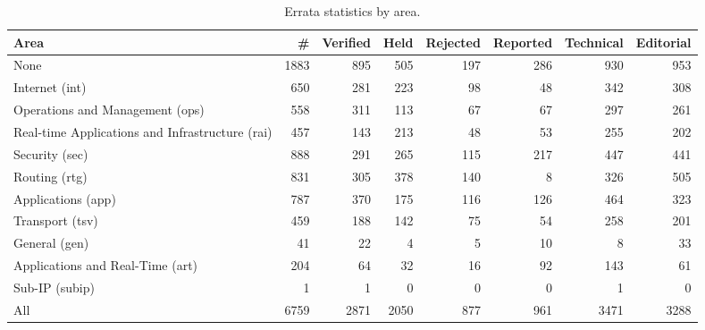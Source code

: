 \begin{table*}
\centering
\footnotesize
\begin{tabular}{lr|rrrr|rr}
\toprule
\textbf{Area} & \textbf{\#} & \textbf{Verified} & \textbf{Held} & \textbf{Rejected} & \textbf{Reported} & \textbf{Technical} & \textbf{Editorial} \\
\midrule
None & 1883  & 895  & 505  & 197  & 286  & 930  & 953 \\
Internet (int) & 650  & 281  & 223  & 98  & 48  & 342  & 308 \\
Operations and Management (ops) & 558  & 311  & 113  & 67  & 67  & 297  & 261 \\
Real-time Applications and Infrastructure (rai) & 457  & 143  & 213  & 48  & 53  & 255  & 202 \\
Security (sec) & 888  & 291  & 265  & 115  & 217  & 447  & 441 \\
Routing (rtg) & 831  & 305  & 378  & 140  & 8  & 326  & 505 \\
Applications (app) & 787  & 370  & 175  & 116  & 126  & 464  & 323 \\
Transport (tsv) & 459  & 188  & 142  & 75  & 54  & 258  & 201 \\
General (gen) & 41  & 22  & 4  & 5  & 10  & 8  & 33 \\
Applications and Real-Time (art) & 204  & 64  & 32  & 16  & 92  & 143  & 61 \\
Sub-IP (subip) & 1  & 1  & 0  & 0  & 0  & 1  & 0 \\
\midrule All & 6759  & 2871  & 2050  & 877  & 961  & 3471  & 3288 \\
\bottomrule
\end{tabular}
\caption{Errata statistics by area.}
\label{tab:errata-stats-area}
\end{table*}
